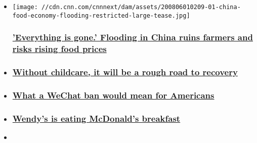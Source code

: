 \begin{itemize}
\item
  \href{/2020/08/08/economy/china-food-economy-flooding-intl-hnk/index.html}{}

  \texttt{[image: //cdn.cnn.com/cnnnext/dam/assets/200806010209-01-china-food-economy-flooding-restricted-large-tease.jpg]}

  \hypertarget{everything-is-gone-flooding-in-china-ruins-farmers-and-risks-rising-food-prices}{%
  \subsubsection{\texorpdfstring{\href{/2020/08/08/economy/china-food-economy-flooding-intl-hnk/index.html}{'Everything
  is gone.' Flooding in China ruins farmers and risks rising food
  prices}}{'Everything is gone.' Flooding in China ruins farmers and risks rising food prices}}\label{everything-is-gone-flooding-in-china-ruins-farmers-and-risks-rising-food-prices}}
\item
  \hypertarget{without-childcare-it-will-be-a-rough-road-to-recovery}{%
  \subsubsection{\texorpdfstring{\href{/2020/08/06/success/childcare-working-parents-coronavirus-work-transformed/index.html}{Without
  childcare, it will be a rough road to
  recovery}}{Without childcare, it will be a rough road to recovery}}\label{without-childcare-it-will-be-a-rough-road-to-recovery}}
\item
  \hypertarget{what-a-wechat-ban-would-mean-for-americans}{%
  \subsubsection{\texorpdfstring{\href{/2020/08/08/tech/wechat-chinese-americans-trump/index.html}{What
  a WeChat ban would mean for
  Americans}}{What a WeChat ban would mean for Americans}}\label{what-a-wechat-ban-would-mean-for-americans}}
\item
  \hypertarget{wendys-is-eating-mcdonalds-breakfast}{%
  \subsubsection{\texorpdfstring{\href{/2020/08/08/business/wendys-breakfast-sales/index.html}{Wendy's
  is eating McDonald's
  breakfast}}{Wendy's is eating McDonald's breakfast}}\label{wendys-is-eating-mcdonalds-breakfast}}
\item
  \hypertarget{instacart-went-on-a-hiring-spree-these-workers-got-squeezed}{%
}
\end{itemize}
